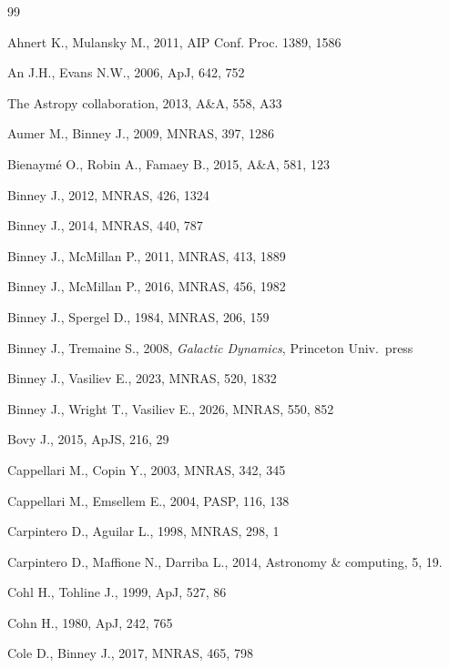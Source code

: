 \documentclass[12pt]{article}
\begin{document}
\newpage
{}

\begin{thebibliography}{99} \setlength{\parskip}{2pt} \setlength{\itemsep}{2pt}

Ahnert K., Mulansky M., 2011, AIP Conf. Proc. 1389, 1586

An J.H., Evans N.W., 2006, ApJ, 642, 752

The Astropy collaboration, 2013, A\&A, 558, A33

Aumer M., Binney J., 2009, MNRAS, 397, 1286

Bienaym\'e O., Robin A., Famaey B., 2015, A\&A, 581, 123

Binney J., 2012, MNRAS, 426, 1324

Binney J., 2014, MNRAS, 440, 787

Binney J., McMillan P., 2011, MNRAS, 413, 1889

Binney J., McMillan P., 2016, MNRAS, 456, 1982

Binney J., Spergel D., 1984, MNRAS, 206, 159

Binney J., Tremaine S., 2008, \textsl{Galactic Dynamics}, Princeton Univ.\ press

Binney J., Vasiliev E., 2023, MNRAS, 520, 1832

Binney J., Wright T., Vasiliev E., 2026, MNRAS, 550, 852

Bovy J., 2015, ApJS, 216, 29

Cappellari M., Copin Y., 2003, MNRAS, 342, 345

Cappellari M., Emsellem E., 2004, PASP, 116, 138

Carpintero D., Aguilar L., 1998, MNRAS, 298, 1

Carpintero D., Maffione N., Darriba L., 2014, Astronomy \& computing, 5, 19.

Cohl H., Tohline J., 1999, ApJ, 527, 86

Cohn H., 1980, ApJ, 242, 765

Cole D., Binney J., 2017, MNRAS, 465, 798


\end{thebibliography}
\end{document}
